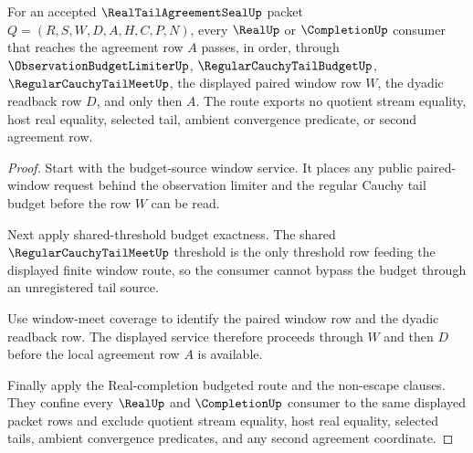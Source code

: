 \begin{theorem}
\label{thm:real-tail-agreement-seal-budgeted-tailmeet-window-exhaustion}
For an accepted $\RealTailAgreementSealUp$ packet $Q=(R,S,W,D,A,H,C,P,N)$, every $\RealUp$ or $\CompletionUp$ consumer that reaches the agreement row $A$ passes, in order, through $\ObservationBudgetLimiterUp$, $\RegularCauchyTailBudgetUp$, $\RegularCauchyTailMeetUp$, the displayed paired window row $W$, the dyadic readback row $D$, and only then $A$. The route exports no quotient stream equality, host real equality, selected tail, ambient convergence predicate, or second agreement row.
\end{theorem}
\begin{proof}
Start with the budget-source window service. It places any public paired-window request behind the observation limiter and the regular Cauchy tail budget before the row $W$ can be read.

Next apply shared-threshold budget exactness. The shared $\RegularCauchyTailMeetUp$ threshold is the only threshold row feeding the displayed finite window route, so the consumer cannot bypass the budget through an unregistered tail source.

Use window-meet coverage to identify the paired window row and the dyadic readback row. The displayed service therefore proceeds through $W$ and then $D$ before the local agreement row $A$ is available.

Finally apply the Real-completion budgeted route and the non-escape clauses. They confine every $\RealUp$ and $\CompletionUp$ consumer to the same displayed packet rows and exclude quotient stream equality, host real equality, selected tails, ambient convergence predicates, and any second agreement coordinate.
\end{proof}

